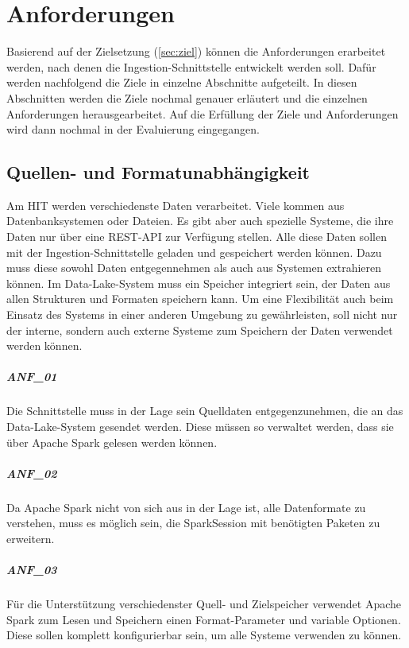 \chapter{Anforderungen}
\label{sec:anf}

Basierend auf der Zielsetzung (\cref{sec:ziel}) können die Anforderungen erarbeitet werden, nach denen die Ingestion-Schnittstelle entwickelt werden soll.
Dafür werden nachfolgend die Ziele in einzelne Abschnitte aufgeteilt.
In diesen Abschnitten werden die Ziele nochmal genauer erläutert und die einzelnen Anforderungen herausgearbeitet.
Auf die Erfüllung der Ziele und Anforderungen wird dann nochmal in der Evaluierung eingegangen.

\section{Quellen- und Formatunabhängigkeit}
\label{sec:anf-unab}
Am HIT werden verschiedenste Daten verarbeitet.
Viele kommen aus Datenbanksystemen oder Dateien.
Es gibt aber auch spezielle Systeme, die ihre Daten nur über eine REST-API zur Verfügung stellen.
Alle diese Daten sollen mit der Ingestion-Schnittstelle geladen und gespeichert werden können.
Dazu muss diese sowohl Daten entgegennehmen als auch aus Systemen extrahieren können.
Im Data-Lake-System muss ein Speicher integriert sein, der Daten aus allen Strukturen und Formaten speichern kann.
Um eine Flexibilität auch beim Einsatz des Systems in einer anderen Umgebung zu gewährleisten, soll nicht nur der interne, sondern auch externe Systeme zum Speichern der Daten verwendet werden können.

\paragraph{ANF\_01}
\label{ANF_01}
Die Schnittstelle muss in der Lage sein Quelldaten entgegenzunehmen, die an das Data-Lake-System gesendet werden.
Diese müssen so verwaltet werden, dass sie über Apache Spark gelesen werden können.

\paragraph{ANF\_02}
\label{ANF_02}
Da Apache Spark nicht von sich aus in der Lage ist, alle Datenformate zu verstehen, muss es möglich sein, die SparkSession mit benötigten Paketen zu erweitern.

\paragraph{ANF\_03}
\label{ANF_03}
Für die Unterstützung verschiedenster Quell- und Zielspeicher verwendet Apache Spark zum Lesen und Speichern einen Format-Parameter und variable Optionen.
Diese sollen komplett konfigurierbar sein, um alle Systeme verwenden zu können.

